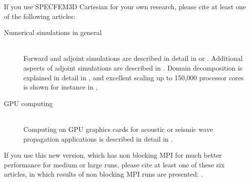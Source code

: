 If you use SPECFEM3D Cartesian for your own research, please cite
at least one of the following articles:
\begin{description}
\item [{Numerical simulations in general}] ~\\
 Forward and adjoint simulations are described in detail in \citet{TrKoLi08,PeKoLuMaLeCaLeMaLiBlNiBaTr11,VaCaSaKoVi99,KoMiEr09,KoErGoMi10,ChKoViCaVaFe07,MaKoDi09,KoViCh10,CaKoLaTiMiLeSnTr08,TrKoHjLiZhPeBoMcFrTrHu10,KoRiTr02,KoTr02a,KoTr02b,KoTr99}
or \citet{KoVi98}. Additional aspects of adjoint simulations are
described in \citet{TrTaLi05,LiTr06,TrKoLi08,LiTr08,TrKoHjLiZhPeBoMcFrTrHu10,PeKoLuMaLeCaLeMaLiBlNiBaTr11}.
Domain decomposition is explained in detail in \citet{MaKoBlLe08},
and excellent scaling up to 150,000 processor cores is shown for instance
in \citet{CaKoLaTiMiLeSnTr08,KoLaMi08a,MaKoBlLe08,KoErGoMi10,Kom11},
\item [{GPU computing}] ~\\
 Computing on GPU graphics cards for acoustic or seismic wave propagation
applications is described in detail in \citet{Kom11,MiKo10,KoMiEr09,KoErGoMi10}.
\end{description}
\noindent If you use this new version, which has non blocking
MPI for much better performance for medium or large runs, please cite
at least one of these six articles, in which results of non blocking
MPI runs are presented: \citet{PeKoLuMaLeCaLeMaLiBlNiBaTr11,KoErGoMi10,KoViCh10,Kom11,CaKoLaTiMiLeSnTr08,MaKoBlLe08}.\\

